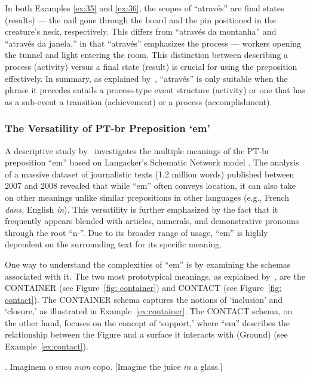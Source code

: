 {{In both Examples \ref{ex:35} and \ref{ex:36}, the scopes of ``através'' are final states (results) --- the nail gone through the board and the pin positioned in the creature's neck, respectively. This differs from ``através da montanha'' and ``através da janela,'' in that ``através'' emphasizes the process --- workers opening the tunnel and light entering the room. This distinction between describing a process (activity) versus a final state (result) is crucial for using the preposition effectively. In summary, as explained by~\textcite{McCleary-Viotti-2004}, ``através'' is only suitable when the phrase it precedes entails a process-type event structure (activity) or one that has as a sub-event a transition (achievement) or a process (accomplishment).


\subsubsection{The Versatility of PT-br Preposition `em'}

A descriptive study by~\textcite{oliveira2012cognitive} investigates the multiple meanings of the PT-br preposition ``em'' based on Langacker's Schematic Network model \parencite{langacker1987foundations}. The analysis of a massive dataset of journalistic texts (1.2 million words) published between 2007 and 2008 revealed that while ``em'' often conveys location, it can also take on other meanings unlike similar prepositions in other languages (e.g., French \emph{dans,} English \emph{in}). 
This versatility is further emphasized by the fact that it frequently appears blended with articles, numerals, and demonstrative pronouns through the root ``n-''. Due to its broader range of usage, ``em'' is highly dependent on the surrounding text for its specific meaning.

One way to understand the complexities of ``em'' is by examining the schemas associated with it. The two most  prototypical meanings, as explained by~\textcite{oliveira2012cognitive}, are the CONTAINER (see Figure~\ref{fig: container}) and CONTACT (see Figure~\ref{fig: contact}). The CONTAINER schema captures the notions of `inclusion' and `closure,' as illustrated in Example~\ref{ex:container}. The CONTACT schema, on the other hand, focuses on the concept of `support,' where ``em'' describes the relationship between the Figure and a surface it interacts with (Ground) (see Example~\ref{ex:contact}).

\ex. Imaginem o suco \emph{num} copo. \newline \label{ex:container}
[Imagine the juice \emph{in} a glass.]

}}
